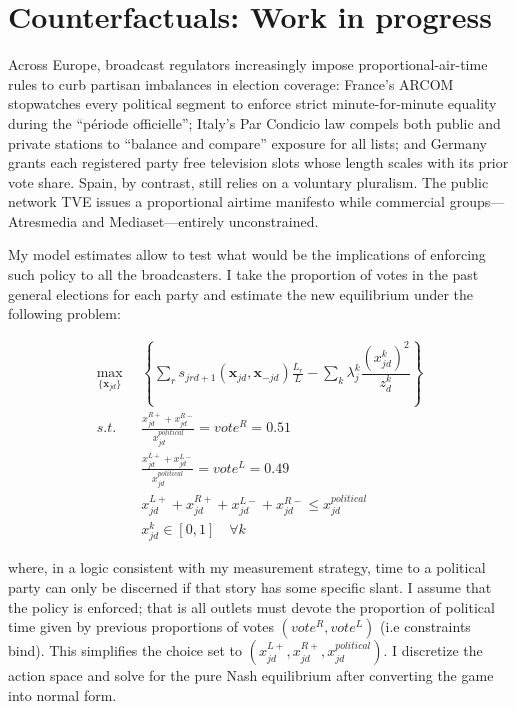 \documentclass[12pt]{article}
\begin{document}
\section{Counterfactuals: Work in progress}

\label{sec:counter}


Across Europe, broadcast regulators increasingly impose proportional-air-time rules to curb partisan imbalances in election coverage: France’s ARCOM stopwatches every political segment to enforce strict minute-for-minute equality during the “période officielle”; Italy’s Par Condicio law compels both public and private stations to “balance and compare” exposure for all lists; and Germany grants each registered party free television slots whose length scales with its prior vote share. Spain, by contrast, still relies on a voluntary pluralism. The public network TVE issues a proportional airtime manifesto while commercial groups—Atresmedia and Mediaset—entirely unconstrained. 

My model estimates allow to test what would be the implications of enforcing such policy to all the broadcasters.  I take the proportion of votes in the past general elections for each party and estimate the new equilibrium under the following problem: 



\begin{equation}\label{eq:payoffs2}
	\begin{aligned}
		\max_{\{\bm{x}_{jd}\}}   & \left\{   \sum_{r}s_{jrd+1}(\bm{x}_{jd}, \bm{x}_{-jd})\frac{L_r}{L} - \sum_k {\lambda_j^k}  \dfrac{(x_{jd}^k)^2}{z_{d}^k}   \right\}\\
		s.t.   \quad &   \frac{x_{jd}^{R+} + x_{jd}^{R-} }{x_{jd}^{political}}=vote^R=0.51\\
		&  \frac{x_{jd}^{L+} + x_{jd}^{L-} }{x_{jd}^{political}}= vote^L=0.49\\
       &  x_{jd}^{L+} +x_{jd}^{R+} + x_{jd}^{L-} + x_{jd}^{R-} \leq  x_{jd}^{political}\\
		& x_{jd}^k \in [0,1] \quad \forall k
	\end{aligned}
\end{equation} 


where, in a logic consistent with my measurement strategy, time to a political party can only be discerned if that story has some specific slant. I assume that the policy is enforced; that is all outlets must devote the proportion of political time given by previous proportions of votes $(vote^R, vote^L)$ (i.e constraints bind). This simplifies the choice set to $\left( x_{jd}^{L+} ,x_{jd}^{R+} ,x_{jd}^{political}\right)$. I discretize the action space and solve for the pure Nash equilibrium after converting the game into normal form. 
\end{document}

